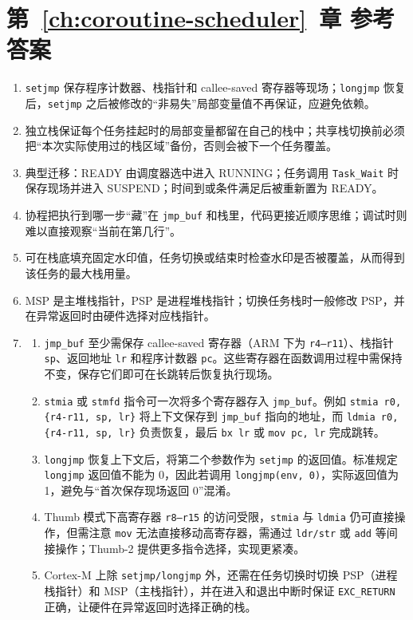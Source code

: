 \section*{第~\ref{ch:coroutine-scheduler}~章 参考答案}

\begin{enumerate}
	\item \texttt{setjmp} 保存程序计数器、栈指针和 callee-saved 寄存器等现场；\texttt{longjmp} 恢复后，\texttt{setjmp} 之后被修改的“非易失”局部变量值不再保证，应避免依赖。
	\item 独立栈保证每个任务挂起时的局部变量都留在自己的栈中；共享栈切换前必须把“本次实际使用过的栈区域”备份，否则会被下一个任务覆盖。
	\item 典型迁移：READY 由调度器选中进入 RUNNING；任务调用 \texttt{Task\_Wait} 时保存现场并进入 SUSPEND；时间到或条件满足后被重新置为 READY。
	\item 协程把执行到哪一步“藏”在 \texttt{jmp\_buf} 和栈里，代码更接近顺序思维；调试时则难以直接观察“当前在第几行”。
	\item 可在栈底填充固定水印值，任务切换或结束时检查水印是否被覆盖，从而得到该任务的最大栈用量。
	\item MSP 是主堆栈指针，PSP 是进程堆栈指针；切换任务栈时一般修改 PSP，并在异常返回时由硬件选择对应栈指针。
	\item
	\begin{enumerate}
		\item \texttt{jmp\_buf} 至少需保存 callee-saved 寄存器（ARM 下为 \texttt{r4--r11}）、栈指针 \texttt{sp}、返回地址 \texttt{lr} 和程序计数器 \texttt{pc}。这些寄存器在函数调用过程中需保持不变，保存它们即可在长跳转后恢复执行现场。
		\item \texttt{stmia} 或 \texttt{stmfd} 指令可一次将多个寄存器存入 \texttt{jmp\_buf}。例如 \texttt{stmia r0, \{r4-r11, sp, lr\}} 将上下文保存到 \texttt{jmp\_buf} 指向的地址，而 \texttt{ldmia r0, \{r4-r11, sp, lr\}} 负责恢复，最后 \texttt{bx lr} 或 \texttt{mov pc, lr} 完成跳转。
		\item \texttt{longjmp} 恢复上下文后，将第二个参数作为 \texttt{setjmp} 的返回值。标准规定 \texttt{longjmp} 返回值不能为 0，因此若调用 \texttt{longjmp(env, 0)}，实际返回值为 1，避免与“首次保存现场返回 0”混淆。
		\item Thumb 模式下高寄存器 \texttt{r8--r15} 的访问受限，\texttt{stmia} 与 \texttt{ldmia} 仍可直接操作，但需注意 \texttt{mov} 无法直接移动高寄存器，需通过 \texttt{ldr/str} 或 \texttt{add} 等间接操作；Thumb-2 提供更多指令选择，实现更紧凑。
		\item Cortex-M 上除 \texttt{setjmp/longjmp} 外，还需在任务切换时切换 PSP（进程栈指针）和 MSP（主栈指针），并在进入和退出中断时保证 \texttt{EXC\_RETURN} 正确，让硬件在异常返回时选择正确的栈。
	\end{enumerate}
\end{enumerate}

